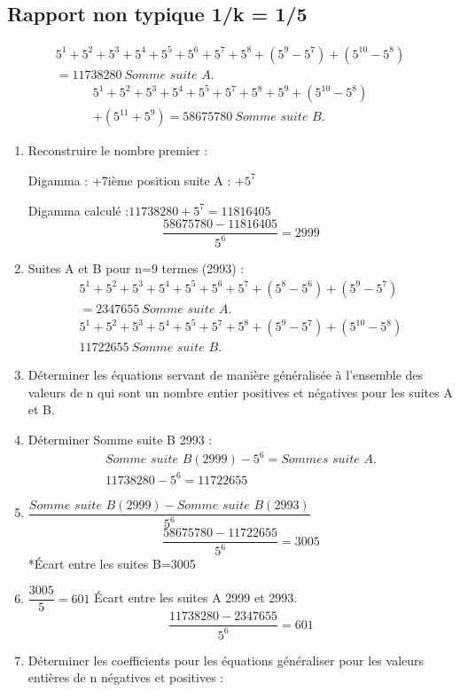 \documentclass[11pt,a4paper]{article}
\begin{document}
\subsection{Rapport non typique 1/k = 1/5}
\begin{gather*}
5^{1}+5^{2}+5^{3}+5^{4}+5^{5}+5^{6}+5^{7}+5^{8}+(5^{9}-5^{7})+(5^{10}-5^{8})\\
=11738280\ \textit{Somme suite A.}
\end{gather*}
\begin{gather*}
5^{1}+5^{2}+5^{3}+5^{4}+5^{5}+5^{7}+5^{8}+5^{9}+(5^{10}-5^{8})\\
+(5^{11}+5^{9})=58675780\ \textit{Somme suite B.}
\end{gather*}
\begin{enumerate}[label=\arabic*.,leftmargin=*,itemsep=6pt]
\item Reconstruire le nombre premier :

Digamma : +7ième position suite A : $+5^{7}$

Digamma calculé :$11738280+5^{7}=11816405$
\[
\frac{58675780-11816405}{5^{6}}=2999
\]
\item Suites A et B pour n=9 termes (2993) :
\begin{gather*}
5^{1}+5^{2}+5^{3}+5^{4}+5^{5}+5^{6}+5^{7}+(5^{8}-5^{6})+(5^{9}-5^{7})\\
=2347655\ \textit{Somme suite A.}\\
5^{1}+5^{2}+5^{3}+5^{4}+5^{5}+5^{7}+5^{8}+(5^{9}-5^{7})+(5^{10}-5^{8})\\
11722655\ \textit{Somme suite B.}
\end{gather*}
\item Déterminer les équations servant de manière généralisée à l’ensemble des valeurs de n qui sont un nombre entier positives et négatives pour les suites A et B.

\item Déterminer Somme suite B 2993 :
\begin{gather*}
\textit{Somme suite B}(2999)-5^{6}=\textit{Sommes suite A.}\\
11738280-5^{6}=11722655
\end{gather*}
\item $\dfrac{\textit{Somme suite B}(2999)-\textit{Somme suite B}(2993)}{5^{6}}$
\[
\frac{58675780-11722655}{5^{6}}=3005
\]
*Écart entre les suites B=3005
\item $\dfrac{3005}{5}=601$ Écart entre les suites A 2999 et 2993.
\[
\frac{11738280-2347655}{5^{6}}=601
\]
\item Déterminer les coefficients pour les équations généraliser pour les valeurs entières de n négatives et positives :


\end{enumerate}
\end{document}
